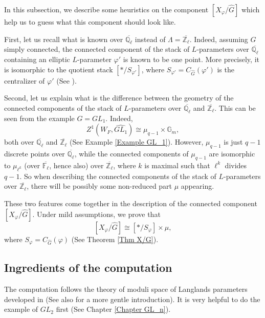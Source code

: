 In this subsection, we describe some heuristics on the component $[X_{\varphi}/\hat{G}]$ which help us to guess what this component should look like.

First, let us recall what is known over $\overline{\mathbb{Q}_{\ell}}$ instead of $\Lambda=\overline{\mathbb{Z}_{\ell}}$. Indeed, assuming $G$ simply connected, the connected component of the stack of $L$-parameters over $\overline{\mathbb{Q}_{\ell}}$ containing an elliptic $L$-parameter $\varphi'$ is known to be one point. More precisely, it is isomorphic to the quotient stack $[*/S_{\varphi'}]$, where $S_{\varphi'}=C_{\hat{G}}(\varphi')$ is the centralizer of $\varphi'$ (See \cite[Section X.2]{fargues2021geometrization}).

Second, let us explain what is the difference between the geometry of the connected components of the stack of $L$-parameters over $\overline{\mathbb{Q}_{\ell}}$ and $\overline{\mathbb{Z}_{\ell}}$. This can be seen from the example $G=GL_1$. Indeed, 
$$Z^1(W_F, \widehat{GL_1}) \cong \mu_{q-1} \times \mathbb{G}_m,$$
both over $\overline{\mathbb{Q}_{\ell}}$ and $\overline{\mathbb{Z}_{\ell}}$ (See Example \ref{Example GL_1}). However, $\mu_{q-1}$ is just $q-1$ discrete points over $\overline{\mathbb{Q}_{\ell}}$, while
the connected components of $\mu_{q-1}$ are isomorphic to $\mu_{\ell^k}$ (over $\overline{\mathbb{F}_{\ell}}$, hence also) over $\overline{\mathbb{Z}_{\ell}}$, where $k$ is maximal such that $\ell^k$ divides $q-1$. So when describing the connected components of the stack of $L$-parameters over $\overline{\mathbb{Z}_{\ell}}$, there will be possibly some non-reduced part $\mu$ appearing.

These two features come together in the description of the connected component $[X_{\varphi}/\hat{G}]$. Under mild assumptions, we prove that
$$[X_{\varphi}/\hat{G}] \cong [*/S_{\varphi}]\times \mu,$$
where $S_{\varphi}=C_{\hat{G}}(\varphi)$ (See Theorem \ref{Thm X/G}).

\subsection{Ingredients of the computation}

The computation follows the theory of moduli space of Langlands parameters developed in \cite[Section 2 and Section 4]{dhkm2020moduli} (See also \cite[Section 3 and Section 4]{dat2022ihes} for a more gentle introduction). It is very helpful to do the example of $GL_2$ first (See Chapter \ref{Chapter GL_n}).

